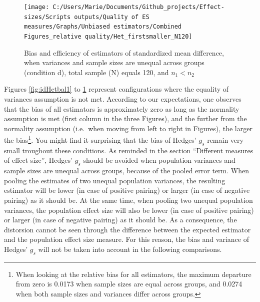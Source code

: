 \documentclass[
  man,floatsintext]{apa6}
\begin{document}
\begin{figure}

{\centering \texttt{[image: C:/Users/Marie/Documents/Github\_projects/Effect-sizes/Scripts outputs/Quality of ES measures/Graphs/Unbiased estimators/Combined Figures\_relative quality/Het\_firstsmaller\_N120]} 

}

\caption{Bias and efficiency of estimators of standardized mean difference, when variances and sample sizes are unequal across groups (condition d), total sample (N) equals 120, and $n_1<n_2$}\label{fig:idHetunbal4}
\end{figure}

Figures \ref{fig:idHetbal1} to \ref{fig:idHetunbal4} represent configurations where the equality of variances assumption is not met. According to our expectations, one observes that the bias of all estimators is approximately zero as long as the normality assumption is met (first column in the three Figures), and the further from the normality assumption (i.e.~when moving from left to right in Figures), the larger the bias\footnote{When looking at the relative bias for all estimators, the maximum departure from zero is 0.0173 when sample sizes are equal across groups, and 0.0274 when both sample sizes and variances differ across groups.}. You might find it surprising that the bias of Hedges' \(g_s\) remain very small troughout these conditions. As reminded in the section \enquote{Different measures of effect size}, Hedges' \(g_s\) should be avoided when population variances and sample sizes are unequal across groups, because of the pooled error term. When pooling the estimates of two unequal population variances, the resulting estimator will be lower (in case of positive pairing) or larger (in case of negative pairing) as it should be. At the same time, when pooling two unequal population variances, the population effect size will also be lower (in case of positive pairing) or larger (in case of negative pairing) as it should be. As a consequence, the distorsion cannot be seen through the difference between the expected estimator and the population effect size measure. For this reason, the bias and variance of Hedges' \(g_s\) will not be taken into account in the following comparisons.
\end{document}
